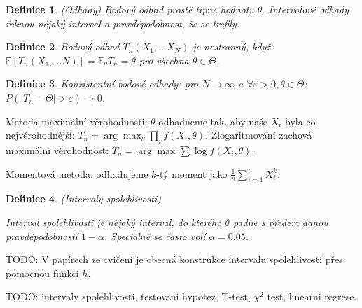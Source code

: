 \documentclass[a4paper,10pt,titlepage]{article} \usepackage[utf8]{inputenc}
\newtheorem{define}{Definice}
\begin{document}
\begin{define}(Odhady)
Bodový odhad prostě tipne hodnotu $\theta$. Intervalové odhady řeknou
nějaký interval a pravděpodobnost, že se trefily.
\end{define}

\begin{define}
Bodový odhad $T_n(X_1,\ldots X_N)$ je nestranný, když $\mathbb{E}[T_n(X_1,\ldots
N)]=\mathbb{E}_{\theta}T_n=\theta$ pro všechna $\theta\in\Theta$.
\end{define}

\begin{define}
Konzistentní bodové odhady: pro $N\rightarrow\infty$ a $\forall\varepsilon>0,
\theta\in\Theta$:
$P(|T_n-\Theta|>\varepsilon)\rightarrow 0$.
\end{define}

Metoda maximální věrohodnosti: $\theta$ odhadneme tak, aby naše $X_i$ byla
co nejvěrohodnější: $T_n=\arg\max_\theta \prod_{i} f(X_i,\theta)$.
Zlogaritmování zachová maximální věrohodnost: $T_n=\arg\max\sum\log
f(X_i,\theta)$.

Momentová metoda: odhadujeme $k$-tý moment jako $\frac{1}{n}\sum_{i=1}^n X_i^k$.

\begin{define}(Intervaly spolehlivosti)

Interval spolehlivosti je nějaký interval, do kterého $\theta$ padne
s předem danou pravděpodobností $1-\alpha$. Speciálně se často volí
$\alpha=0.05$.
\end{define}

TODO: V papírech ze cvičení je obecná konstrukce intervalu spolehlivosti
přes pomocnou funkci $h$.

TODO: intervaly spolehlivosti, testovani hypotez, T-test, $\chi^2$ test, linearni regrese.
\end{document}
